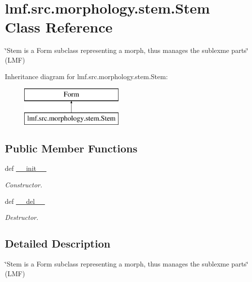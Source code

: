 \hypertarget{classlmf_1_1src_1_1morphology_1_1stem_1_1_stem}{\section{lmf.\+src.\+morphology.\+stem.\+Stem Class Reference}
\label{classlmf_1_1src_1_1morphology_1_1stem_1_1_stem}
}


\char`\"{}\+Stem is a Form subclass representing a morph, thus manages the sublexme parts\char`\"{} (L\+M\+F)  


Inheritance diagram for lmf.\+src.\+morphology.\+stem.\+Stem\+:\begin{figure}[H]
\begin{center}
\leavevmode
\includegraphics[height=2.000000cm]{classlmf_1_1src_1_1morphology_1_1stem_1_1_stem}
\end{center}
\end{figure}
\subsection*{Public Member Functions}
\begin{DoxyCompactItemize}
\item 
def \hyperlink{classlmf_1_1src_1_1morphology_1_1stem_1_1_stem_a0bb6ab66b2421c82cd8dffdd3bbc765d}{\+\_\+\+\_\+init\+\_\+\+\_\+}
\begin{DoxyCompactList}\small\item\em Constructor. \end{DoxyCompactList}\item 
def \hyperlink{classlmf_1_1src_1_1morphology_1_1stem_1_1_stem_a8081b50172bca2543d1a4989dbaf2f32}{\+\_\+\+\_\+del\+\_\+\+\_\+}
\begin{DoxyCompactList}\small\item\em Destructor. \end{DoxyCompactList}\end{DoxyCompactItemize}


\subsection{Detailed Description}
\char`\"{}\+Stem is a Form subclass representing a morph, thus manages the sublexme parts\char`\"{} (L\+M\+F) 

